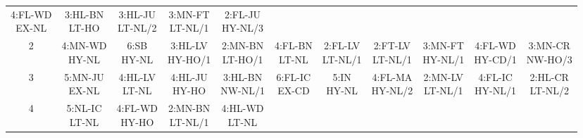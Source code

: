 \begin{table}[htbp]
{\begin{minipage}{0.9\textwidth}
\begin{tabular}{c|cccccccccc}
    \parbox{\cellwidth}{4:FL-WD\\EX-NL} & 
    \parbox{\cellwidth}{3:HL-BN\\LT-HO} & 
    \parbox{\cellwidth}{3:HL-JU\\LT-NL/2} & 
    \parbox{\cellwidth}{3:MN-FT\\LT-NL/1} & 
    \parbox{\cellwidth}{2:FL-JU\\HY-NL/3}\\[\extralinespace]
    2 & 
    \parbox{\cellwidth}{4:MN-WD\\HY-NL} & 
    \parbox{\cellwidth}{6:SB\\HY-NL} & 
    \parbox{\cellwidth}{3:HL-LV\\HY-HO/1} & 
    \parbox{\cellwidth}{2:MN-BN\\LT-HO/1} & 
    \parbox{\cellwidth}{4:FL-BN\\LT-NL} & 
    \parbox{\cellwidth}{2:FL-LV\\LT-NL/1} & 
    \parbox{\cellwidth}{2:FT-LV\\LT-NL/1} & 
    \parbox{\cellwidth}{3:MN-FT\\HY-NL/1} & 
    \parbox{\cellwidth}{4:FL-WD\\HY-CD/1} & 
    \parbox{\cellwidth}{3:MN-CR\\NW-HO/3}\\[\extralinespace]
    3 & 
    \parbox{\cellwidth}{5:MN-JU\\EX-NL} & 
    \parbox{\cellwidth}{4:HL-LV\\LT-NL} & 
    \parbox{\cellwidth}{4:HL-JU\\HY-HO} & 
    \parbox{\cellwidth}{3:HL-BN\\NW-NL/1} & 
    \parbox{\cellwidth}{6:FL-IC\\EX-CD} & 
    \parbox{\cellwidth}{5:IN\\HY-NL} & 
    \parbox{\cellwidth}{4:FL-MA\\HY-NL/2} & 
    \parbox{\cellwidth}{2:MN-LV\\LT-NL/1} & 
    \parbox{\cellwidth}{4:FL-IC\\HY-NL/1} & 
    \parbox{\cellwidth}{2:HL-CR\\LT-NL/2}\\[\extralinespace]
    4 & 
    \parbox{\cellwidth}{5:NL-IC\\LT-NL} & 
    \parbox{\cellwidth}{4:FL-WD\\HY-HO} & 
    \parbox{\cellwidth}{2:MN-BN\\LT-NL/1} & 
    \parbox{\cellwidth}{4:HL-WD\\LT-NL} & 

\end{tabular}
\end{minipage}}
\end{table}
